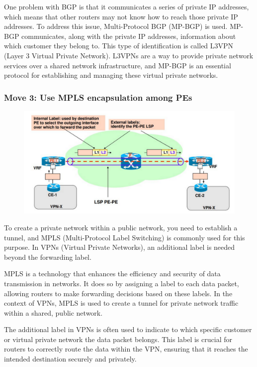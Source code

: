 \documentclass[12pt]{article}
\begin{document}
One problem with BGP is that it communicates a series of private IP 
addresses, which means that other routers may not know how to 
reach those private IP addresses. 
To address this issue, Multi-Protocol BGP (MP-BGP) is used. MP-BGP 
communicates, along with the private IP addresses, information about which customer they belong to. This type of identification is called L3VPN (Layer 3 Virtual Private Network). L3VPNs are a way to provide private network services over a shared network infrastructure, and MP-BGP is an essential protocol for establishing and managing these virtual private networks.
\newpage
\subsubsection*{Move 3: Use MPLS encapsulation among PEs}

\begin{figure}[ht]
    \includegraphics[scale = 0.4]{Example5.png}
    \centering
\end{figure}

To create a private network within a public network, you need to establish a tunnel, and MPLS (Multi-Protocol Label Switching) is commonly used for this purpose. In VPNs (Virtual Private Networks), an additional label is needed beyond the forwarding label.

MPLS is a technology that enhances the efficiency and security of data transmission in networks. It does so by assigning a label to each data packet, allowing routers to make forwarding decisions based on these labels. In the context of VPNs, MPLS is used to create a tunnel for private network traffic within a shared, public network.

The additional label in VPNs is often used to indicate to which specific customer or virtual private network the data packet belongs. This label is crucial for routers to correctly route the data within the VPN, ensuring that it reaches the intended destination securely and privately.
\end{document}
